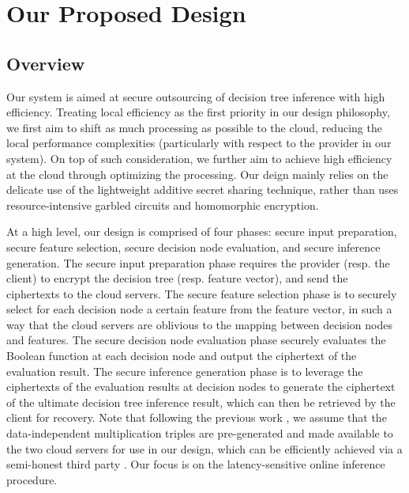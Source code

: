 \documentclass[10pt,journal,compsoc]{IEEEtran}
\begin{document}
\section{Our Proposed Design}
\label{sec:secure-design}



\subsection{Overview}

Our system is aimed at secure outsourcing of decision tree inference with high efficiency.
%
%
Treating local efficiency as the first priority in our design philosophy, we first aim to shift as much processing as possible to the cloud, reducing the local performance complexities (particularly with respect to the provider in our system).
%
On top of such consideration, we further aim to achieve high efficiency at the cloud through optimizing the processing.
%
Our deign mainly relies on the delicate use of the lightweight additive secret sharing technique, rather than uses resource-intensive garbled circuits and homomorphic encryption.  
%



At a high level, our design is comprised of four phases: secure input preparation, secure feature selection, secure decision node evaluation, and secure inference generation.
% 
The secure input preparation phase requires the provider (resp. the client) to encrypt the decision tree (resp. feature vector), and send the ciphertexts to the cloud servers.
%
The secure feature selection phase is to securely select for each decision node a certain feature from the feature vector, in such a way that the cloud servers are oblivious to the mapping between decision nodes and features.
%
The secure decision node evaluation phase securely evaluates the Boolean function at each decision node and output the ciphertext of the evaluation result.
%
The secure inference generation phase is to leverage the ciphertexts of the evaluation results at decision nodes to generate the ciphertext of the ultimate decision tree inference result, which can then be retrieved by the client for recovery.
%
Note that following the previous work \cite{ZhengDWWN20}, we assume that the data-independent multiplication triples are pre-generated and made available to the two cloud servers for use in our design, which can be efficiently achieved via a semi-honest third party \cite{RiaziWTS0K18,ZhengDWWN20}. 
%
Our focus is on the latency-sensitive online inference procedure. 
%
\end{document}
